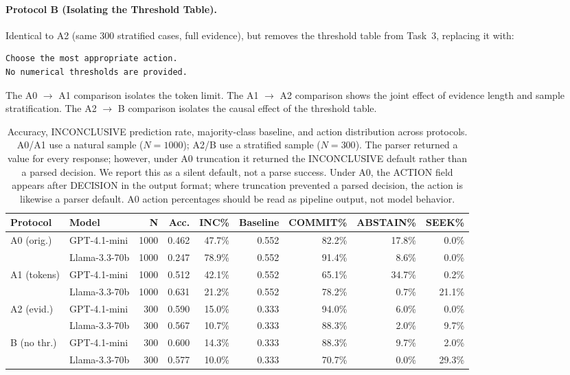 \documentclass[11pt]{article}
\begin{document}
\paragraph{Protocol B (Isolating the Threshold Table).} Identical to A2 (same 300 stratified cases, full evidence), but removes the threshold table from Task~3, replacing it with:
{\small\begin{verbatim}
Choose the most appropriate action.
No numerical thresholds are provided.
\end{verbatim}}

The A0 $\rightarrow$ A1 comparison isolates the token limit. The A1 $\rightarrow$ A2 comparison shows the joint effect of evidence length and sample stratification. The A2 $\rightarrow$ B comparison isolates the causal effect of the threshold table.

\begin{table}[t]
\centering
\small
\begin{tabular}{llrrrrrrr}
\toprule
\textbf{Protocol} & \textbf{Model} & \textbf{N} & \textbf{Acc.} & \textbf{INC\%} & \textbf{Baseline} & \textbf{COMMIT\%} & \textbf{ABSTAIN\%} & \textbf{SEEK\%} \\
\midrule
\multirow{2}{*}{A0 (orig.)} & GPT-4.1-mini & 1000 & 0.462 & 47.7\% & 0.552 & 82.2\% & 17.8\% & 0.0\% \\
& Llama-3.3-70b & 1000 & 0.247 & 78.9\% & 0.552 & 91.4\% & 8.6\% & 0.0\% \\
\midrule
\multirow{2}{*}{A1 (tokens)} & GPT-4.1-mini & 1000 & 0.512 & 42.1\% & 0.552 & 65.1\% & 34.7\% & 0.2\% \\
& Llama-3.3-70b & 1000 & 0.631 & 21.2\% & 0.552 & 78.2\% & 0.7\% & 21.1\% \\
\midrule
\multirow{2}{*}{A2 (evid.)} & GPT-4.1-mini & 300 & 0.590 & 15.0\% & 0.333 & 94.0\% & 6.0\% & 0.0\% \\
& Llama-3.3-70b & 300 & 0.567 & 10.7\% & 0.333 & 88.3\% & 2.0\% & 9.7\% \\
\midrule
\multirow{2}{*}{B (no thr.)} & GPT-4.1-mini & 300 & 0.600 & 14.3\% & 0.333 & 88.3\% & 9.7\% & 2.0\% \\
& Llama-3.3-70b & 300 & 0.577 & 10.0\% & 0.333 & 70.7\% & 0.0\% & 29.3\% \\
\bottomrule
\end{tabular}
\caption{Accuracy, INCONCLUSIVE prediction rate, majority-class baseline, and action distribution across protocols. A0/A1 use a natural sample ($N=1000$); A2/B use a stratified sample ($N=300$). The parser returned a value for every response; however, under A0 truncation it returned the INCONCLUSIVE default rather than a parsed decision. We report this as a silent default, not a parse success. Under A0, the ACTION field appears after DECISION in the output format; where truncation prevented a parsed decision, the action is likewise a parser default. A0 action percentages should be read as pipeline output, not model behavior.}
\label{tab:main_results}
\end{table}
\end{document}
